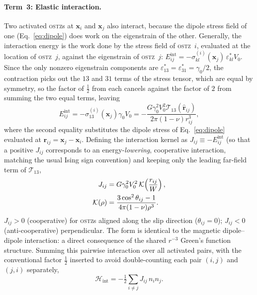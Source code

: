 \documentclass[5p,sort&compress]{elsarticle}
\newcommand{\OSTZ}{\textsc{ostz}}
\newcommand{\gz}{\gamma_0}
\newcommand{\half}{\tfrac{1}{2}}
\begin{document}
\paragraph{Term~3: Elastic interaction.}
Two activated \OSTZ s at $\mathbf x_i$ and $\mathbf x_j$ also
interact, because the dipole stress field of one (Eq.~\eqref{eq:dipole})
does work on the eigenstrain of the other. Generally, the interaction
energy is the work done by the stress field of \OSTZ\ $i$, evaluated
at the location of \OSTZ\ $j$, against the eigenstrain of \OSTZ\ $j$:
$E_{ij}^\text{int}=-\sigma_{kl}^{(i)}(\mathbf x_j)\,\varepsilon^*_{kl}V_0$.
Since the only nonzero eigenstrain components are
$\varepsilon^*_{13}=\varepsilon^*_{31}=\gz/2$, the contraction picks
out the $13$ and $31$ terms of the stress tensor, which are equal by
symmetry, so the factor of $\half$ from each cancels against the
factor of $2$ from summing the two equal terms, leaving
\begin{equation}
  E_{ij}^\text{int}=-\sigma_{13}^{(i)}(\mathbf x_j)\gz V_0
  =-\frac{G\gz^2V_0^2\mathcal T_{13}(\hat{\mathbf r}_{ij})}
  {2\pi(1-\nu)r_{ij}^3},
  \label{eq:Eint}
\end{equation}
where the second equality substitutes the dipole stress of
Eq.~\eqref{eq:dipole} evaluated at $\mathbf r_{ij}=\mathbf
x_j-\mathbf x_i$. Defining the interaction kernel as
$J_{ij}\equiv-E_{ij}^\text{int}$ (so that a positive $J_{ij}$
corresponds to an energy-\emph{lowering}, cooperative interaction,
matching the usual Ising sign convention) and keeping only the
leading far-field term of $\mathcal T_{13}$,
\begin{align}
  J_{ij}&=G\gz^2V_0^2\,\mathcal K\!\left(\frac{r_{ij}}{W}\right),
    \label{eq:Jij}\\
  \mathcal K(\rho)&=\frac{3\cos^2\theta_{ij}-1}{4\pi(1-\nu)\rho^3}.
    \notag
\end{align}
$J_{ij}>0$ (cooperative) for \OSTZ s aligned along the slip direction
($\theta_{ij}=0$); $J_{ij}<0$ (anti-cooperative) perpendicular.
The form is identical to the magnetic dipole--dipole interaction: a
direct consequence of the shared $r^{-3}$ Green's function structure.
Summing this pairwise interaction over all activated pairs, with the
conventional factor $\half$ inserted to avoid double-counting each
pair $(i,j)$ and $(j,i)$ separately,
\begin{equation}
  \mathcal H_\text{int}=-\half\sum_{i\ne j}J_{ij}\,n_in_j.
  \label{eq:Hint}
\end{equation}
\end{document}

